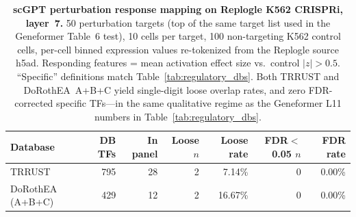 \documentclass[onecolumn]{article}
\begin{document}
\begin{table}[H]
\centering
\caption{\textbf{scGPT perturbation response mapping on Replogle K562 CRISPRi, layer~7.} 50 perturbation targets (top of the same target list used in the Geneformer Table~6 test), 10 cells per target, 100 non-targeting K562 control cells, per-cell binned expression values re-tokenized from the Replogle source h5ad. Responding features = mean activation effect size vs.\ control $|z| > 0.5$. ``Specific'' definitions match Table~\ref{tab:regulatory_dbs}. Both TRRUST and DoRothEA~A+B+C yield single-digit loose overlap rates, and zero FDR-corrected specific TFs---in the same qualitative regime as the Geneformer L11 numbers in Table~\ref{tab:regulatory_dbs}.}
\label{tab:scgpt_pert}
\smallskip
\small
\begin{tabular}{lrrrrrr}
\toprule
Database & DB TFs & In panel & Loose $n$ & Loose rate & FDR$<$0.05 $n$ & FDR rate \\
\midrule
TRRUST           & 795 & 28 & 2 & 7.14\% & 0 & 0.00\% \\
DoRothEA (A+B+C) & 429 & 12 & 2 & 16.67\% & 0 & 0.00\% \\
\bottomrule
\end{tabular}
\end{table}
\end{document}

